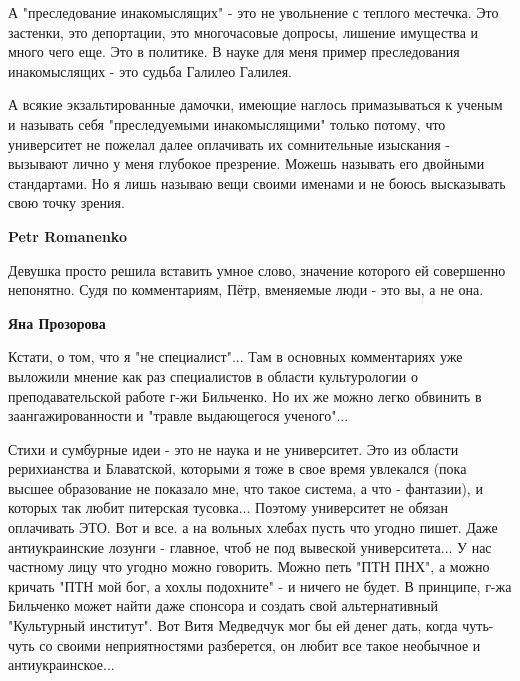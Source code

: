 \begin{itemize}
\begin{itemize}
 

А "преследование инакомыслящих" - это не увольнение с теплого местечка. Это
застенки, это депортации, это многочасовые допросы, лишение имущества и много
чего еще. Это в политике. В науке для меня пример преследования инакомыслящих -
это судьба Галилео Галилея. 

А всякие экзальтированные дамочки, имеющие наглось
примазываться к ученым и называть себя "преследуемыми инакомыслящими" только
потому, что университет не пожелал далее оплачивать их сомнительные изыскания -
вызывают лично у меня глубокое презрение. Можешь называть его двойными
стандартами. Но я лишь называю вещи своими именами и не боюсь высказывать свою
точку зрения.


 
\textbf{Petr Romanenko} 

Девушка просто решила вставить умное слово, значение которого ей совершенно
непонятно. Судя по комментариям, Пётр, вменяемые люди - это вы, а не она.

 
\textbf{Яна Прозорова} 

Кстати, о том, что я "не специалист"... Там в основных комментариях уже
выложили мнение как раз специалистов в области культурологии о
преподавательской работе г-жи Бильченко. Но их же можно легко обвинить в
заангажированности и "травле выдающегося ученого"... 

Стихи и сумбурные идеи - это не наука и не университет. Это из области
рерихианства и Блаватской, которыми я тоже в свое время увлекался (пока высшее
образование не показало мне, что такое система, а что - фантазии), и которых
так любит питерская тусовка... Поэтому университет не обязан оплачивать ЭТО.
Вот и все. а на вольных хлебах пусть что угодно пишет. Даже антиукраинские
лозунги - главное, чтоб не под вывеской университета... У нас частному лицу что
угодно можно говорить. Можно петь "ПТН ПНХ", а можно кричать "ПТН мой бог, а
хохлы подохните" - и ничего не будет. В принципе, г-жа Бильченко может найти
даже спонсора и создать свой альтернативный "Культурный институт". Вот Витя
Медведчук мог бы ей денег дать, когда чуть-чуть со своими неприятностями
разберется, он любит все такое необычное и антиукраинское...



\end{itemize}
\end{itemize}
